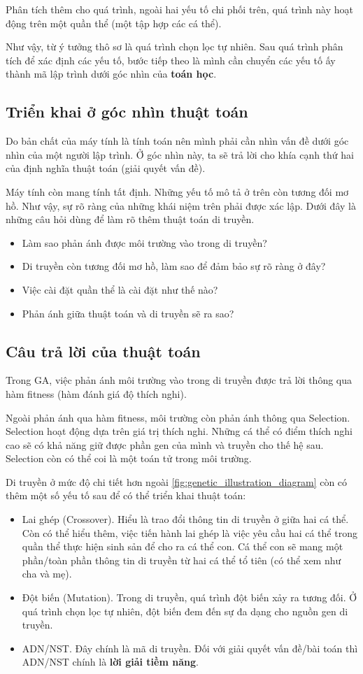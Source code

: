 Phân tích thêm cho quá trình, ngoài hai yếu tố chi phối trên, quá trình này hoạt động trên một quần thể (một tập hợp các cá thể).

Như vậy, từ ý tưởng thô sơ là quá trình chọn lọc tự nhiên. Sau quá trình phân tích để xác định các yếu tố, bước tiếp theo là mình cần chuyển các yếu tố ấy thành mã lập trình dưới góc nhìn của \textbf{toán học}.

\subsection{Triển khai ở góc nhìn thuật toán}
Do bản chất của máy tính là tính toán nên mình phải cần nhìn vấn đề dưới góc nhìn của một người lập trình. Ở góc nhìn này, ta sẽ trả lời cho khía cạnh thứ hai của định nghĩa thuật toán (giải quyết vấn đề).

Máy tính còn mang tính tất định. Những yếu tố mô tả ở trên còn tương đối mơ hồ. Như vậy, sự rõ ràng của những khái niệm trên phải được xác lập. Dưới đây là những câu hỏi dùng để làm rõ thêm thuật toán di truyền.
\begin{itemize}
	\item Làm sao phản ánh được môi trường vào trong di truyền?
	\item Di truyền còn tương đối mơ hồ, làm sao để đảm bảo sự rõ ràng ở đây?
	\item Việc cài đặt quần thể là cài đặt như thế nào?
	\item Phản ánh giữa thuật toán và di truyền sẽ ra sao?
\end{itemize}

\subsection{Câu trả lời của thuật toán}
Trong GA, việc phản ánh môi trường vào trong di truyền được trả lời thông qua hàm fitness (hàm đánh giá độ thích nghi).

Ngoài phản ánh qua hàm fitness, môi trường còn phản ánh thông qua Selection. Selection hoạt động dựa trên giá trị thích nghi. Những cá thể có điểm thích nghi cao sẽ có khả năng giữ được phần gen của mình và truyền cho thế hệ sau. Selection còn có thể coi là một toán tử trong môi trường.

Di truyền ở mức độ chi tiết hơn ngoài \ref{fig:genetic_illustration_diagram} còn có thêm một số yếu tố sau để có thể triển khai thuật toán:
\begin{itemize}
	\item Lai ghép (Crossover). Hiểu là trao đổi thông tin di truyền ở giữa hai cá thể. Còn có thể hiểu thêm, việc tiến hành lai ghép là việc yêu cầu hai cá thể trong quần thể thực hiện sinh sản để cho ra cá thể con. Cá thể con sẽ mang một phần/toàn phần thông tin di truyền từ hai cá thể tổ tiên (có thể xem như cha và mẹ).
	\item  Đột biến (Mutation). Trong di truyền, quá trình đột biến xảy ra tương đối. Ở quá trình chọn lọc tự nhiên, đột biến đem đến sự đa dạng cho nguồn gen di truyền.
	\item  ADN/NST. Đây chính là mã di truyền. Đối với giải quyết vấn đề/bài toán thì ADN/NST chính là \textbf{lời giải tiềm năng}.  
\end{itemize}

